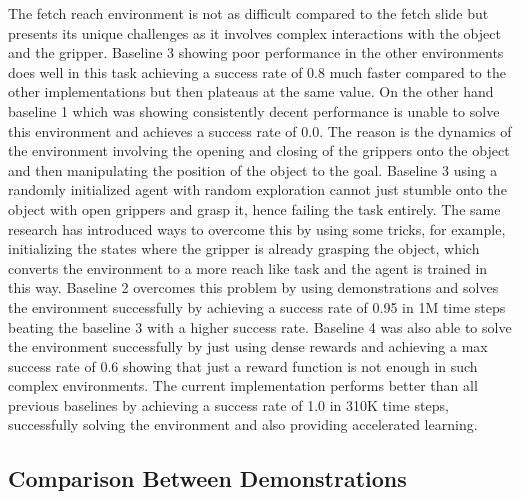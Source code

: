 The fetch reach environment is not as difficult compared to the fetch slide but presents its unique challenges as it involves complex interactions with the object and the gripper. Baseline 3 showing poor performance in the other environments does well in this task achieving a success rate of 0.8 much faster compared to the other implementations but then plateaus at the same value. On the other hand baseline 1 which was showing consistently decent performance is unable to solve this environment and achieves a success rate of 0.0. The reason is the dynamics of the environment involving the opening and closing of the grippers onto the object and then manipulating the position of the object to the goal. Baseline 3 using a randomly initialized agent with random exploration cannot just stumble onto the object with open grippers and grasp it, hence failing the task entirely. The same research has introduced ways to overcome this by using some tricks, for example, initializing the states where the gripper is already grasping the object, which converts the environment to a more reach like task and the agent is trained in this way.  Baseline 2 overcomes this problem by using demonstrations and solves the environment successfully by achieving a success rate of 0.95 in 1M time steps beating the baseline 3 with a higher success rate. Baseline 4 was also able to solve the environment successfully by just using dense rewards and achieving a max success rate of 0.6 showing that just a reward function is not enough in such complex environments. The current implementation performs better than all previous baselines by achieving a success rate of 1.0 in 310K time steps, successfully solving the environment and also providing accelerated learning. \\

\subsection{Comparison Between Demonstrations}

